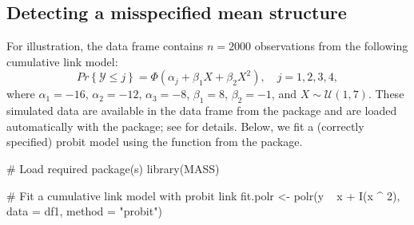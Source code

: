 \subsection{Detecting a misspecified mean structure}

For illustration, the data frame  contains $n = 2000$ observations from the following cumulative link model:
\begin{equation}
\label{eqn:quadratic}
  Pr\left\{\mathcal{Y} \le j\right\} = \Phi\left(\alpha_j + \beta_1 X + \beta_2 X ^ 2\right), \quad j = 1, 2, 3, 4,
\end{equation}
where $\alpha_1 = -16$, $\alpha_2 = -12$, $\alpha_3 = -8$, $\beta_1 = 8$, $\beta_2 = -1$, and $X \sim \mathcal{U}\left(1, 7\right)$. These simulated data are available in the  data frame from the  package and are loaded automatically with the package; see  for details. Below, we fit a (correctly specified) probit model using the  function from the  package.
\begin{example}
# Load required package(s)
library(MASS)

# Fit a cumulative link model with probit link
fit.polr <- polr(y ~ x + I(x ^ 2), data = df1, method = "probit")
\end{example}

